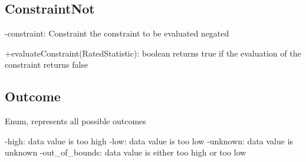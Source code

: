 \subsection{ConstraintNot}
	-constraint: Constraint
		the constraint to be evaluated negated

	+evaluateConstraint(RatedStatistic): boolean
		returns true if the evaluation of the constraint returns false



\subsection{Outcome}
	Enum, represents all possible outcomes

	-high: data value is too high
	-low: data value is too low
	-unknown: data value is unknown
	-out\_of\_bounds: data value is either too high or too low